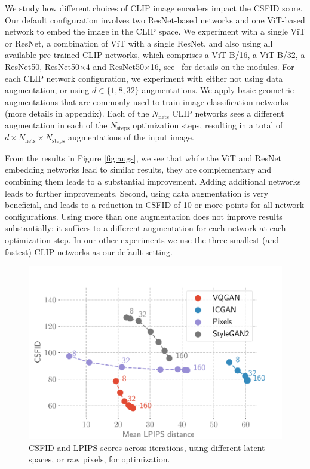 We study how different choices of CLIP image encoders impact the CSFID score. 
Our default configuration involves two ResNet-based networks and one ViT-based network 
to embed the image in the CLIP space. 
We experiment with a single ViT or ResNet, a combination of ViT with a single  ResNet,  
and also using all available pre-trained CLIP networks, which comprises a ViT-B/16, a
 ViT-B/32, a ResNet50, ResNet50$\times$4 and ResNet50$\times$16,
  see~\cite{radford21clip} for details on the modules.
For each CLIP network configuration, we experiment with  either  not using data 
augmentation, or using $d \in\{ 1, 8, 32\}$ augmentations.
We apply basic geometric augmentations that are commonly used to train image 
classification networks (more details in appendix).
Each of the $N_\textrm{nets}$ CLIP networks sees a different augmentation in each of 
the $N_\textrm{steps}$ optimization steps,  resulting in a total of
 $d \times N_\textrm{nets} \times N_\textrm{steps}$ augmentations of the input image.

From the results in Figure \ref{fig:augs}, we see that while the  ViT and  ResNet 
embedding networks lead to similar results, they are complementary and combining them 
leads to a substantial improvement.  
Adding additional networks leads to further improvements.
%
Second, using data augmentation is very beneficial, and leads to a reduction in CSFID 
of 10 or more points for all network configurations. 
Using more than one augmentation does not improve results substantially: it suffices 
to a different augmentation for each network at each optimization step.
In our other experiments we use the three smallest (and fastest) CLIP networks as our 
default setting.


\begin{figure}
    \centering
    \vspace{-3em}
    \includegraphics[width=.9\linewidth]{images/flexit/assets/encoder_evol.pdf}
    \caption{CSFID and LPIPS scores across iterations, using different latent spaces, or raw pixels, for optimization. 
    }
    \label{fig:encoders}
    \vspace{-1em}
\end{figure}


